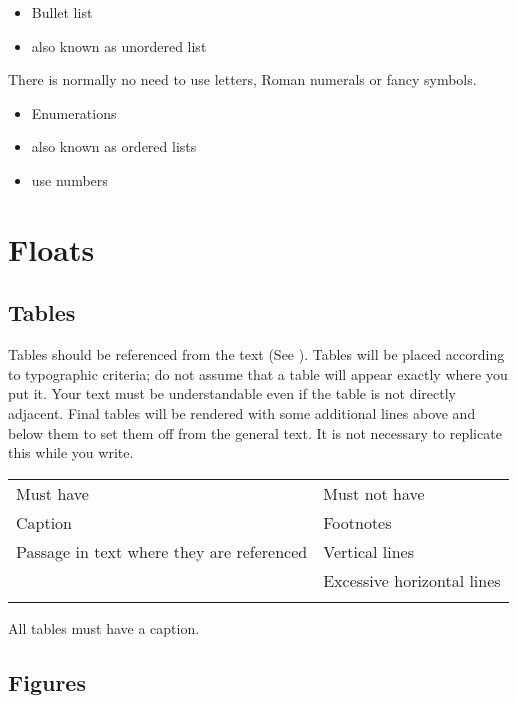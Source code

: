 \begin{itemize}
\item Bullet list 
\item also known as unordered list
\end{itemize}

There is normally no need to use letters, Roman numerals or fancy symbols.

\begin{itemize}
\item Enumerations
\item also known as ordered lists
\item use numbers
\end{itemize}
\chapter{Floats}

\section{Tables} 

Tables should be referenced from the text (See ). Tables will be placed according to typographic criteria; do not assume that a table will appear exactly where you put it. Your text must be understandable even if the table is not directly adjacent. Final tables will be rendered with some additional lines above and below them to set them off from the general text. It is not necessary to replicate this while you write.

\begin{tabularx}{\textwidth}{XX}
\lsptoprule
 Must have & Must not have\\
 Caption & Footnotes\\
 Passage in text where they are referenced & Vertical lines\\
& Excessive horizontal lines\\
\lspbottomrule
\end{tabularx}
\begin{table}
\caption{All tables must have a caption.}
\label{tab:1}
\end{table}

\section{Figures}

